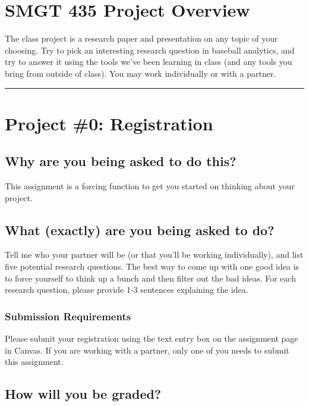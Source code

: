 \documentclass{article}
\begin{document}
  \section*{\sc SMGT 435 Project Overview}

    The class project is a research paper and presentation on any topic of your choosing. Try to pick an interesting research question in baseball analytics, and try to answer it using the tools we've been learning in class (and any tools you bring from outside of class). You may work individually or with a partner.\\
  
  \hrule
  \section*{\sc Project \#0: Registration}

    \subsection*{\sc Why are you being asked to do this?}

      This assignment is a forcing function to get you started on thinking about your project.
    
    \subsection*{\sc What (exactly) are you being asked to do?}

    Tell me who your partner will be (or that you'll be working individually), and list five potential research questions. The best way to come up with one good idea is to force yourself to think up a bunch and then filter out the bad ideas. For each research question, please provide 1-3 sentences explaining the idea.

      \subsubsection*{\sc Submission Requirements}

        Please submit your registration using the text entry box on the assignment page in Canvas. If you are working with a partner, only one of you needs to submit this assignment.

    \subsection*{\sc How will you be graded?}
\end{document}
